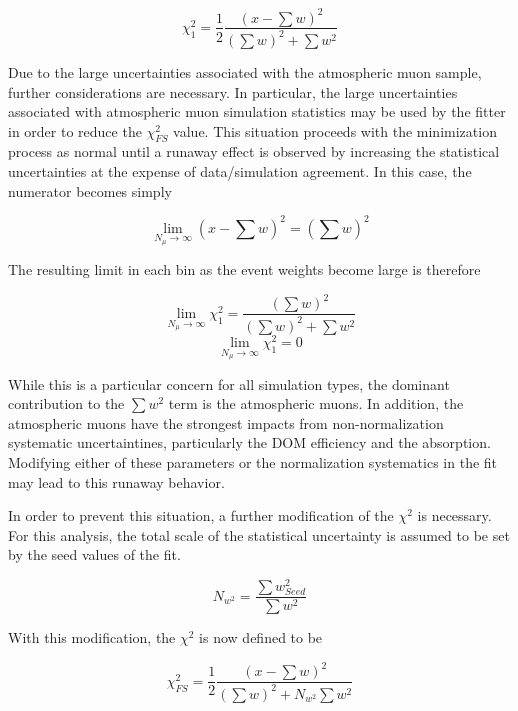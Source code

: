 \label{eqn:mchi2}
\begin{equation}
	\chi^2_{1} =\frac{1}{2}\frac{\left(x-\sum w\right)^2}{\left(\sum{w}\right)^2 + \sum{w^2}}
\end{equation}		

Due to the large uncertainties associated with the atmospheric muon sample, further considerations are necessary.
In particular, the large uncertainties associated with atmospheric muon simulation statistics may be used by the fitter in order to reduce the $\chi^2_{FS}$ value.
This situation proceeds with the minimization process as normal until a runaway effect is observed by increasing the statistical uncertainties at the expense of data/simulation agreement.
In this case, the numerator becomes simply

\label{eqn:mchi2_num}
\begin{equation}
	\lim_{N_{\mu}\rightarrow\infty} \left(x-\sum w\right)^2 = \left(\sum w\right)^2
\end{equation}

The resulting limit in each bin as the event weights become large is therefore

\label{eqn:mchi2_lim}
\begin{equation}
	\lim_{N_{\mu}\rightarrow\infty} \chi^2_{1} =  \frac{\left(\sum w\right)^2}{\left(\sum{w}\right)^2 + \sum{w^2}}
\end{equation}
\begin{equation}
	\lim_{N_{\mu}\rightarrow\infty} \chi^2_{1} = 0
\end{equation}

While this is a particular concern for all simulation types, the dominant contribution to the $\sum{w^2}$ term is the atmospheric muons. 
In addition, the atmospheric muons have the strongest impacts from non-normalization systematic uncertaintines, particularly the DOM efficiency and the absorption.
Modifying either of these parameters or the normalization systematics in the fit may lead to this runaway behavior.

In order to prevent this situation, a further modification of the $\chi^2$ is necessary.
For this analysis, the total scale of the statistical uncertainty is assumed to be set by the seed values of the fit.

\label{eqn:w2_constant}
\begin{equation}
	N_{w^2} = \frac{\sum{w^2_{Seed}}}{\sum{w^2}}
\end{equation}

With this modification, the $\chi^2$ is now defined to be

\begin{equation}
	\chi^2_{FS} =\frac{1}{2}\frac{\left(x-\sum w\right)^2}{\left(\sum{w}\right)^2 + N_{w^2}\sum{w^2}}
\end{equation}